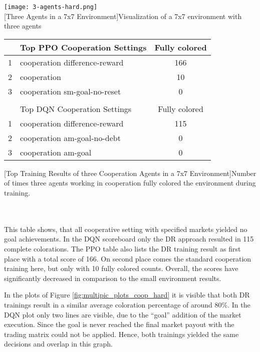 \begin{minipage}{\textwidth}
  \begin{minipage}[b]{0.29\textwidth}
    \centering
    \texttt{[image: 3-agents-hard.png]}\\
    [Three Agents in a 7x7 Environment]{Visualization of a 7x7 environment with three agents}\label{fig:3-hard}
  \end{minipage}
  \hfill
    \begin{minipage}[b]{0.69\textwidth}
    \centering
    \begin{tabular}{clc}\hline
         & Top PPO Cooperation Settings & Fully colored \\ \hline
        {\small1} & cooperation difference-reward & 166 \\
        {\small2} & cooperation & 10 \\
        {\small3} & cooperation sm-goal-no-reset & 0 \\ \hline
         &   \\ \hline
         & Top DQN Cooperation Settings & Fully colored \\ \hline
        {\small 1} & cooperation difference-reward & 115 \\
        {\small 2} & cooperation am-goal-no-debt & 0 \\
        {\small 3} & cooperation am-goal & 0 \\ \hline
        \end{tabular}
        [Top Training Results of three Cooperation Agents in a 7x7 Environment]{Number of times three agents working in cooperation fully colored the environment during training. \\}\label{t:3-coop-hard}
    \end{minipage}
  \end{minipage}\\\\

This table shows, that all cooperative setting with specified markets yielded no goal achievements. In the DQN scoreboard only the DR approach resulted in 115 complete colorations. The PPO table also lists the DR training result as first place with a total score of 166. On second place comes the standard cooperation training here, but only with 10 fully colored counts. Overall, the scores have significantly decreased in comparison to the small environment results.

In the plots of Figure \ref{fig:multipic_plots_coop_hard} it is visible that both DR trainings result in a similar average coloration percentage of around 80\%. In the DQN plot only two lines are visible, due to the ``goal'' addition of the market execution. Since the goal is never reached the final market payout with the trading matrix could not be applied. Hence, both trainings yielded the same decisions and overlap in this graph. 

